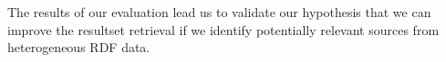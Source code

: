 The results of our evaluation lead us to validate our hypothesis that we can improve the resultset retrieval if we identify potentially relevant sources from heterogeneous RDF data.

